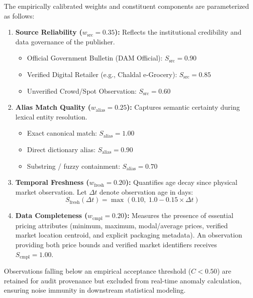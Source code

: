 The empirically calibrated weights and constituent components are parameterized as follows:
\begin{enumerate}
    \item \textbf{Source Reliability ($w_{\text{src}} = 0.35$):} Reflects the institutional credibility and data governance of the publisher.
    \begin{itemize}
        \item Official Government Bulletin (DAM Official): $S_{\text{src}} = 0.90$
        \item Verified Digital Retailer (e.g., Chaldal e-Grocery): $S_{\text{src}} = 0.85$
        \item Unverified Crowd/Spot Observation: $S_{\text{src}} = 0.60$
    \end{itemize}
    \item \textbf{Alias Match Quality ($w_{\text{alias}} = 0.25$):} Captures semantic certainty during lexical entity resolution.
    \begin{itemize}
        \item Exact canonical match: $S_{\text{alias}} = 1.00$
        \item Direct dictionary alias: $S_{\text{alias}} = 0.90$
        \item Substring / fuzzy containment: $S_{\text{alias}} = 0.70$
    \end{itemize}
    \item \textbf{Temporal Freshness ($w_{\text{fresh}} = 0.20$):} Quantifies age decay since physical market observation.
    Let $\Delta t$ denote observation age in days:
    \begin{equation}
    S_{\text{fresh}}(\Delta t) = \max\left(0.10, \; 1.0 - 0.15 \times \Delta t\right)
    \end{equation}
    \item \textbf{Data Completeness ($w_{\text{cmpl}} = 0.20$):} Measures the presence of essential pricing attributes (minimum, maximum, modal/average prices, verified market location centroid, and explicit packaging metadata). An observation providing both price bounds and verified market identifiers receives $S_{\text{cmpl}} = 1.00$.
\end{enumerate}

Observations falling below an empirical acceptance threshold ($C < 0.50$) are retained for audit provenance but excluded from real-time anomaly calculation, ensuring noise immunity in downstream statistical modeling.
